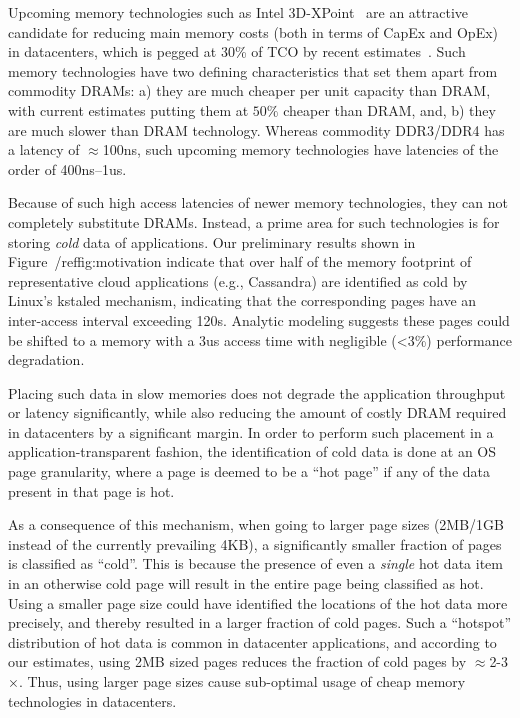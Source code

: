 
%
Upcoming memory technologies such as Intel 3D-XPoint~\cite{xpoint} are an
attractive candidate for reducing main memory costs (both in terms of CapEx and
OpEx) in datacenters, which is pegged at 30\% of TCO by recent
estimates~\cite{XXX}. Such memory technologies have two defining characteristics
that set them apart from commodity DRAMs: a) they are much cheaper per unit
capacity than DRAM, with current estimates putting them at $50\%$ cheaper
than DRAM, and, b) they are much slower than DRAM technology. Whereas
commodity DDR3/DDR4 has a latency of $\approx$100ns, such upcoming memory
technologies have latencies of the order of 400ns--1us.

Because of such high access latencies of newer memory technologies, they can not
completely substitute DRAMs. Instead, a prime area for such technologies is for
storing {\it cold} data of applications.  Our preliminary results shown in
Figure~/ref{fig:motivation} indicate that over half of the memory footprint of
representative cloud applications (e.g., Cassandra) are identified as cold by
Linux’s kstaled mechanism, indicating that the corresponding pages have an
inter-access interval exceeding 120s.  Analytic modeling suggests these pages
could be shifted to a memory with a 3us access time with negligible (<3\%)
performance degradation.


Placing such data in slow memories does not degrade the application throughput
or latency significantly, while also reducing the amount of costly DRAM required
in datacenters by a significant margin. In order to perform such placement in a
application-transparent fashion, the identification of cold data is done at an
OS page granularity, where a page is deemed to be a ``hot page'' if any of the
data present in that page is hot.

As a consequence of this mechanism, when going to larger page sizes (2MB/1GB
instead of the currently prevailing 4KB), a significantly smaller fraction of
pages is classified as ``cold''. This is because the presence of even a {\it
single} hot data item in an otherwise cold page will result in the entire page
being classified as hot. Using a smaller page size could have identified the
locations of the hot data more precisely, and thereby resulted in a larger
fraction of cold pages. Such a ``hotspot'' distribution of hot data is common in
datacenter applications, and according to our estimates, using 2MB sized pages
reduces the fraction of cold pages by $\approx$2-3$\times$. Thus, using larger
page sizes cause sub-optimal usage of cheap memory technologies in datacenters.


